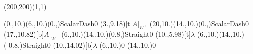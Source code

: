 \unitlength=1bp%

\begin{feynartspicture}(200,200)(1,1)

\FADiagram{}
\FAProp(0.,10.)(6.,10.)(0.,){ScalarDash}{0}
\FALabel(3.,9.18)[t]{$A|_{W^\perp}$}
\FAProp(20,10.)(14.,10.)(0.,){ScalarDash}{0}
\FALabel(17.,10.82)[b]{$A|_{W^\perp}$}
\FAProp(6.,10.)(14.,10.)(0.8,){Straight}{0}
\FALabel(10.,5.98)[t]{$\lambda$}
\FAProp(6.,10.)(14.,10.)(-0.8,){Straight}{0}
\FALabel(10.,14.02)[b]{$\lambda$}
\FAVert(6.,10.){0}
\FAVert(14.,10.){0}
\end{feynartspicture}


